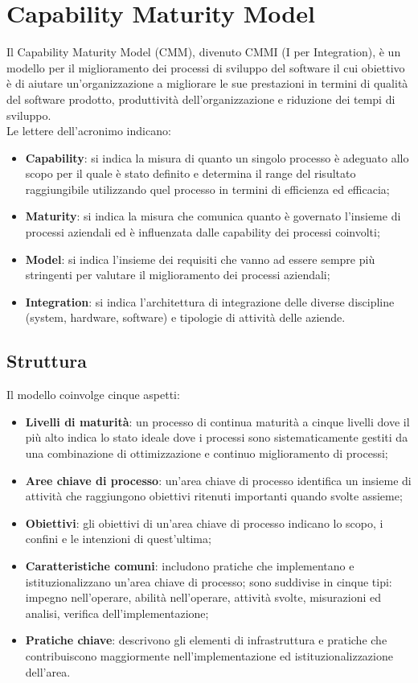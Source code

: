 \documentclass[../PianoDiQualifica.tex]{subfiles}
\begin{document}
	\section{Capability Maturity Model}\label{app:CMM}
		Il Capability Maturity Model (CMM), divenuto CMMI (I per Integration), è un modello per il
		miglioramento dei processi di sviluppo del software il cui obiettivo è di aiutare
		un'organizzazione a migliorare le sue prestazioni in termini di qualità del software prodotto,
		produttività dell'organizzazione e riduzione dei tempi di sviluppo.\\
		Le lettere dell'acronimo indicano: 
		\begin{itemize}
			\item \textbf{Capability}: si indica la misura di quanto un singolo processo è adeguato
			allo scopo per il quale è stato definito e determina il range del risultato raggiungibile
			utilizzando	quel processo in termini di efficienza ed efficacia;
			\item \textbf{Maturity}: si indica la misura che comunica quanto è governato l'insieme di
			processi aziendali ed è influenzata dalle capability dei processi coinvolti;
			\item \textbf{Model}: si indica l'insieme dei requisiti che vanno ad essere sempre più
			stringenti per valutare il miglioramento dei processi aziendali;
			\item \textbf{Integration}: si indica l'architettura di integrazione delle diverse
			discipline (system, hardware, software) e tipologie di attività delle aziende.
		\end{itemize}
		\subsection{Struttura}
			Il modello coinvolge cinque aspetti:
			\begin{itemize}
				\item \textbf{Livelli di maturità}: un processo di continua maturità a cinque livelli
				dove il più alto indica lo stato ideale dove i processi sono sistematicamente gestiti
				da una combinazione di ottimizzazione e continuo miglioramento di processi;
				\item \textbf{Aree chiave di processo}: un'area chiave di processo identifica un
				insieme di attività che raggiungono obiettivi ritenuti importanti quando svolte
				assieme;
				\item \textbf{Obiettivi}: gli obiettivi di un'area chiave di processo indicano lo
				scopo, i confini e le intenzioni di quest'ultima;
				\item \textbf{Caratteristiche comuni}: includono pratiche che implementano e
				istituzionalizzano un'area chiave di processo; sono suddivise in cinque tipi: impegno
				nell'operare, abilità nell'operare, attività svolte, misurazioni ed analisi, verifica
				dell'implementazione;
				\item \textbf{Pratiche chiave}: descrivono gli elementi di infrastruttura e pratiche
				che contribuiscono maggiormente nell'implementazione ed istituzionalizzazione
				dell'area.
			\end{itemize}
\end{document}
